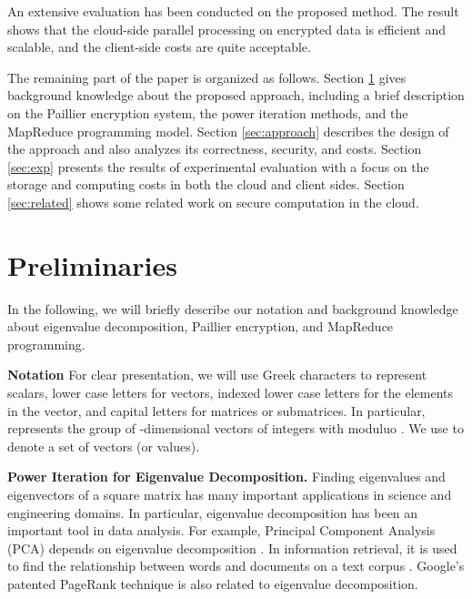 \documentclass[10pt, conference, compsocconf]{IEEEtran}
\begin{document}
An extensive evaluation has been conducted on the proposed method. The result shows that the cloud-side parallel processing on encrypted data is efficient and scalable, and the client-side costs are quite acceptable. 

The remaining part of the paper is organized as follows. Section \ref{sec:pre} gives background knowledge about the proposed approach, including a brief description on the Paillier encryption system, the power iteration methods, and the MapReduce programming model. Section \ref{sec:approach} describes the design of the approach and also analyzes its correctness, security, and costs. Section \ref{sec:exp} presents the results of experimental evaluation with a focus on the storage and computing costs in both the cloud and client sides. Section \ref{sec:related} shows some related work on secure computation in the cloud.

\section{Preliminaries} \label{sec:pre}


In the following, we will briefly describe our notation and background knowledge about eigenvalue decomposition, Paillier encryption, and MapReduce programming. 

\textbf{Notation}
For clear presentation, we will use Greek characters to represent scalars, lower case letters for vectors, indexed lower case letters for the elements in the vector, and capital letters for matrices or submatrices. In particular,  represents the group of -dimensional vectors of integers with moduluo .
We use  to denote a set of vectors (or values). 



\textbf{Power Iteration for Eigenvalue Decomposition.} Finding eigenvalues and eigenvectors of a square matrix has many important applications in science and engineering domains. In particular, eigenvalue decomposition has been an important tool in data analysis. For example, Principal Component Analysis (PCA) depends on eigenvalue decomposition \cite{jolliffe86}. In information retrieval, it is used to find the relationship between words and documents on a text corpus \cite{deerwester90}. Google's patented PageRank technique\cite{brin98} is also related to eigenvalue decomposition. 
\end{document}
